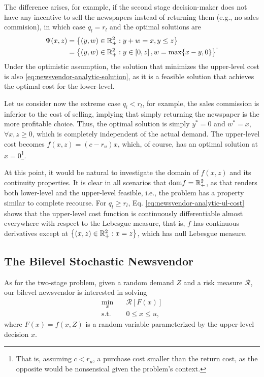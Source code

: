 \documentclass[12pt]{article}
\begin{document}
The difference arises, for example, if the second stage decision-maker does not have any incentive to sell the newspapers instead of returning them (e.g., no sales commision), in which case $q_l = r_l$ and the optimal solutions are
\begin{equation*}
\begin{split}
    \Psi(x,z) &= \left\{ (y,w)\in \mathbb{R}^2_{+} : y+w = x, y\le z \right\} \\
	      &= \left\{ (y,w)\in \mathbb{R}^2_{+} : y \in \left[ 0,z \right] , w = \max\{x-y,0\} \right\} 
\end{split}
.\end{equation*}
Under the optimistic assumption, the solution that minimizes the upper-level cost is also \eqref{eq:newsvendor-analytic-solution}, as it is a feasible solution that achieves the optimal cost for the lower-level.

Let us consider now the extreme case $q_l < r_l$, for example, the sales commission is inferior to the cost of selling, implying that simply returning the newspaper is the more profitable choice.
Thus, the optimal solution is simply $y^{*}=0$ and $w^{*}=x$, $\forall x,z\ge 0$, which is completely independent of the actual demand.
The upper-level cost becomes $f(x,z) = (c - r_u) x$, which, of course, has an optimal solution at  $x=0$\footnote{That is, assuming $c< r_u$, a purchase cost smaller than the return cost, as the opposite would be nonsensical given the problem's context.}.

At this point, it would be natural to investigate the domain of $f(x,z)$ and its continuity properties.
It is clear in all scenarios that $\text{dom} f = \mathbb{R}^{2}_{+}$, as that renders both lower-level and the upper-level feasible, i.e., the problem has a property similar to complete recourse.
For $q_l \ge r_l$, Eq. \eqref{eq:newsvendor-analytic-ul-cost} shows that the upper-level cost function is continuously differentiable almost everywhere with respect to the Lebesgue measure, that is, $f$ has continuous derivatives except at $\left\{ (x,z) \in \mathbb{R}^2_{+} : x = z \right\}$, which has null Lebesgue measure.


\subsection*{The Bilevel Stochastic Newsvendor}

As for the two-stage problem, given a random demand $Z$ and a risk measure $\mathcal{R}$, our bilevel newsvendor is interested in solving
\begin{equation}
\begin{split}
    \min_{x} \quad & \mathcal{R}[F(x)] \\
    \textrm{s.t.} \quad & 0\le x\le u
,\end{split}
\end{equation}
where $F(x)=f(x,Z)$ is a random variable parameterized by the upper-level decision $x$.
\end{document}
